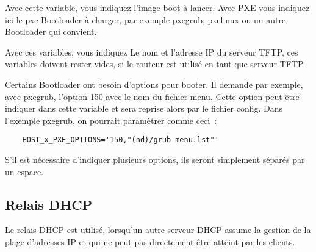 \begin{description}

    Avec cette variable, vous indiquez l'image boot à lancer. Avec PXE vous
    indiquez ici le pxe-Bootloader à charger, par exemple pxegrub, pxelinux
    ou un autre Bootloader qui convient.


    Avec ces variables, vous indiquez Le nom et l'adresse IP du serveur TFTP,
    ces variables doivent rester vides, si le routeur est utilisé en tant que
    serveur TFTP.


    Certains Bootloader ont besoin d'options pour booter. Il demande par exemple,
    avec pxegrub, l'option 150 avec le nom du fichier menu. Cette option peut
    être indiquer dans cette variable et sera reprise alors par le fichier config.
    Dans l'exemple pxegrub, on pourrait paramètrer comme ceci~: \\
    \begin{example}
      \begin{verbatim}
    HOST_x_PXE_OPTIONS='150,"(nd)/grub-menu.lst"'
      \end{verbatim}
    \end{example}

    S'il est nécessaire d'indiquer plusieurs options, ils seront simplement
    séparés par un espace.
\end{description}


\subsection {Relais DHCP}

    Le relais DHCP est utilisé, lorsqu'un autre serveur DHCP assume la
    gestion de la plage d'adresses IP et qui ne peut pas directement être
    atteint par les clients.

